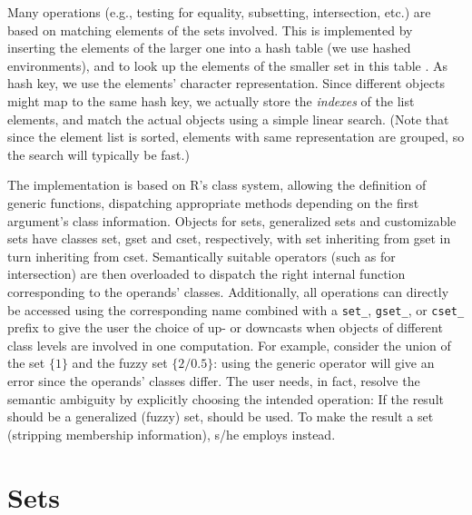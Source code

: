 \documentclass[article]{jss}
\newcommand\R{\textsf{R}}
\newcommand{\class}[1]{\textsf{#1}}
\newcommand{\samp}[1]{\normalfont\texttt{#1}}
\newcommand{\codefun}[1]{\code{#1()}}
\begin{document}
Many operations (e.g., testing for equality, subsetting, intersection,
etc.) are based on matching elements of the sets involved.  This is
implemented by inserting the elements of the larger one into a hash
table (we use hashed environments), and to look up the elements of the
smaller set in this table \citep[p.~391]{sets:knuth:1973}.  As hash key,
we use the elements' character representation. Since different objects
might map to the same hash key, we actually store the \emph{indexes} of
the list elements, and match the actual objects using a simple linear
search. (Note that since the element list is sorted, elements with same
representation are grouped, so the search will typically be fast.)

The implementation is based on \R's  class system, allowing
the definition of generic functions, dispatching appropriate methods
depending on the first argument's class information.
Objects for sets, generalized sets and customizable sets have
classes \class{set}, \class{gset} and \class{cset}, respectively, with
\class{set} inheriting from \class{gset} in turn inheriting from
\class{cset}.
Semantically suitable operators (such as \code{\&} for intersection)
are then overloaded to dispatch the right internal function
corresponding to the operands' classes.
Additionally, all operations can directly be accessed using the
corresponding name combined with a \samp{set\_}, \samp{gset\_}, or
\samp{cset\_} prefix to give the user
the choice of up- or downcasts when objects of different class levels
are involved in one computation. For example, consider the union of the
set $\{1\}$ and the fuzzy set $\{2/0.5\}$: using the generic operator
will give an error since the operands' classes differ. The user needs,
in fact, resolve the semantic ambiguity by explicitly choosing the
intended operation: If the result should be a
generalized (fuzzy) set, \codefun{gset\_union} should be used.  To make
the result a set (stripping membership information), s/he employs
\codefun{set\_union} instead.

\section{Sets}
\label{sec:sets}
\end{document}
